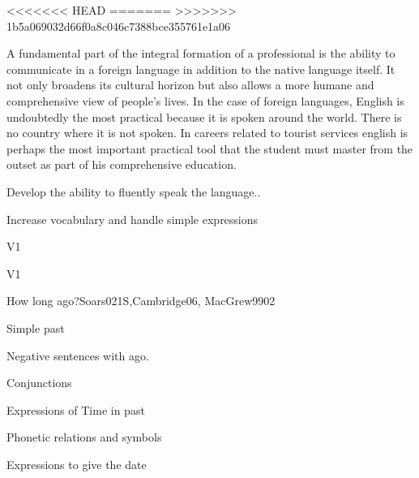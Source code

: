 \begin{syllabus}

<<<<<<< HEAD
=======
>>>>>>> 1b5a069032d66f0a8c046c7388bce355761e1a06

\begin{justification}
A fundamental part of the integral formation of a professional is the ability to communicate in a foreign language in addition to the native language itself. It not only broadens its cultural horizon but also allows a more humane and comprehensive view of people's lives. In the case of foreign languages, English is undoubtedly the most practical because it is spoken around the world. There is no country where it is not spoken.
In careers related to tourist services english is perhaps the most important practical tool that the student must master from the outset as part of his comprehensive education.
\end{justification}

\begin{goals}
\item Develop the ability to fluently speak the language..
\item Increase vocabulary and handle simple expressions
\end{goals}

\begin{outcomes}{V1}
\item {}
\end{outcomes}

\begin{competences}{V1}
    \item {}
\end{competences}

\begin{unit}{How long ago?}{}{Soars021S,Cambridge06, MacGrew99}{0}{2}
   \begin{topics}
      \item Simple past
      \item Negative sentences with ago.
      \item Conjunctions
      \item Expressions of Time in past
      \item Phonetic relations and symbols
      \item Expressions to give the date
   \end{topics}


\end{unit}
\end{syllabus}
